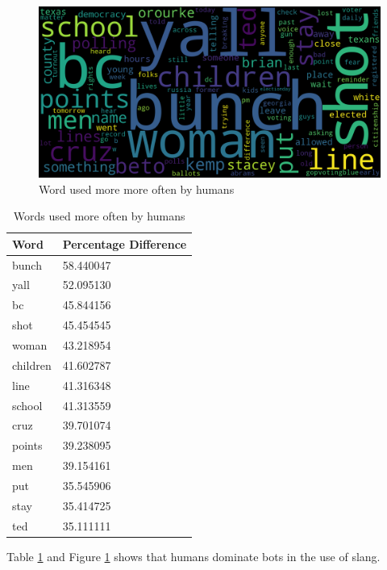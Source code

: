\documentclass[letterpaper]{article}
\begin{document}
\begin{figure}[H]
    \includegraphics[width=\linewidth]{images/mostly_humans.png}
    \caption{Word used more more often by humans}
    \label{fig:humans_dominant}
\end{figure}

\begin{table}[H]
    \centering
    \begin{tabular}{|l|l|}
    \hline
    \textbf{Word} & \textbf{Percentage Difference} \\ \hline
    bunch & 58.440047 \\ \hline
    yall & 52.095130 \\ \hline
    bc & 45.844156 \\ \hline
    shot & 45.454545 \\ \hline
    woman & 43.218954 \\ \hline
    children & 41.602787 \\ \hline
    line & 41.316348 \\ \hline
    school & 41.313559 \\ \hline
    cruz & 39.701074 \\ \hline
    points & 39.238095 \\ \hline
    men & 39.154161 \\ \hline
    put & 35.545906 \\ \hline
    stay & 35.414725 \\ \hline
    ted & 35.111111 \\ \hline
    \end{tabular}
    \caption{Words used more often by humans}
    \label{tab:humans-dominant-words}
\end{table}

Table \ref{tab:humans-dominant-words} and Figure \ref{fig:humans_dominant} shows that humans dominate bots in the use of slang. \par
\end{document}
